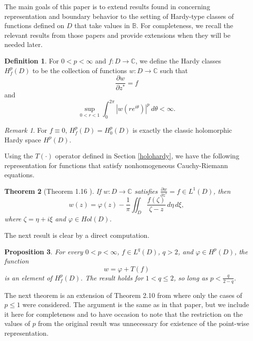 \documentclass[suppldata]{interact}
\theoremstyle{plain}%
\newtheorem{theorem}{Theorem}[section]
\newtheorem{prop}[theorem]{Proposition}
\theoremstyle{definition}
\newtheorem{deff}[theorem]{Definition}
\theoremstyle{remark}
\newtheorem{comm}{Remark}
\newcommand{\C}{\mathbb C}
\newcommand{\p}{\partial}
\newcommand{\bc}{\mathbb{B}}
\begin{document}
The main goals of this paper is to extend results found in \cite{WB} concerning representation and boundary behavior to the setting of Hardy-type classes of functions defined on $D$ that take values in $\bc$. For completeness, we recall the relevant results from those papers and provide extensions when they will be needed later. 

\begin{deff}\label{cgenhardydef}
For $0 < p < \infty$ and $f: D \to \C$, we define the Hardy classes $H^p_f(D)$ to be the collection of functions $w: D \to \C$ such that 
\[
    \frac{\p w}{\p z^*} = f
\]
and 
\[
    \sup_{0 < r < 1} \int_0^{2\pi} |w(re^{i\theta})|^p \,d\theta < \infty.
\]
\end{deff}

\begin{comm}
    For $f \equiv 0$, $H^p_f(D) = H^p_0(D)$ is exactly the classic holomorphic Hardy space $H^p(D)$. 
\end{comm}


Using the $T(\cdot)$ operator defined in Section \ref{holohardy}, we have the following representation for functions that satisfy nonhomogeneous Cauchy-Riemann equations.

\begin{theorem}[Theorem 1.16 \cite{Vek}]\label{oneonesix}
If $w: D \to \C$ satisfies $\frac{\p w}{\p z^*} = f \in L^1(D)$, then 
\begin{equation}\label{cp}
w(z) = \varphi(z) - \frac{1}{\pi} \iint_D \frac{f(\zeta)}{\zeta - z}\,d\eta\,d\xi,
\end{equation}
where $\zeta = \eta + i\xi$ and $\varphi \in Hol(D)$. 
\end{theorem}

The next result is clear by a direct computation. 

\begin{prop}
    For every $0 < p < \infty$, $f \in L^q(D)$, $q>2$, and $\varphi \in H^p(D)$, the function 
    \[
        w = \varphi + T(f)
    \]  
    is an element of $H^p_f(D)$. The result holds for $1 < q \leq 2$, so long as $p < \frac{q}{2-q}$.
\end{prop}


The next theorem is an extension of Theorem 2.10 from \cite{WB} where only the cases of $p \leq 1$ were considered. The argument is the same as in that paper, but we include it here for completeness and to have occasion to note that the restriction on the values of $p$ from the original result was unnecessary for existence of the point-wise representation. 
\end{document}
